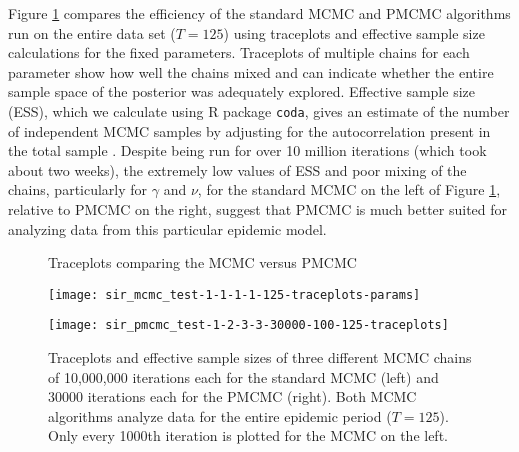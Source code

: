 Figure \ref{fig:epid:mcmc} compares the efficiency of the standard MCMC and PMCMC algorithms run on the entire data set ($T = 125$) using traceplots and effective sample size calculations for the fixed parameters. Traceplots of multiple chains for each parameter show how well the chains mixed and can indicate whether the entire sample space of the posterior was adequately explored. Effective sample size (ESS), which we calculate using R package {\tt coda}, gives an estimate of the number of independent MCMC samples by adjusting for the autocorrelation present in the total sample \citep{coda}. Despite being run for over 10 million iterations (which took about two weeks), the extremely low values of ESS and poor mixing of the chains, particularly for $\gamma$ and $\nu$, for the standard MCMC on the left of Figure \ref{fig:epid:mcmc}, relative to PMCMC on the right, suggest that PMCMC is much better suited for analyzing data from this particular epidemic model.

\begin{figure}
\ssp
\centering
\caption{Traceplots comparing the MCMC versus PMCMC} \label{fig:epid:mcmc}
\begin{minipage}{0.45\linewidth}
\texttt{[image: sir\_mcmc\_test-1-1-1-1-125-traceplots-params]}
\end{minipage}
\begin{minipage}{0.45\linewidth}
\texttt{[image: sir\_pmcmc\_test-1-2-3-3-30000-100-125-traceplots]}
\end{minipage}
\caption*{Traceplots and effective sample sizes of three different MCMC chains of 10,000,000 iterations each for the standard MCMC (left) and 30000 iterations each for the PMCMC (right). Both MCMC algorithms analyze data for the entire epidemic period ($T = 125$). Only every 1000th iteration is plotted for the MCMC on the left.}
\end{figure}

